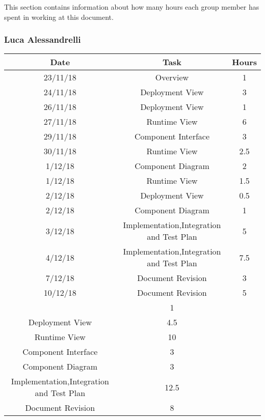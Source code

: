 \noindent
This section contains information about how many hours each group member has spent in working at this document.
\bigbreak

\subsubsection{Luca Alessandrelli}
\begin{table}[h]
\centering
\begin{tabular}{|c|c|c|}
\hline
\rowcolor[HTML]{FE996B} 
Date & Task & Hours 
\\ \hline
\rowcolor[HTML]{FFFC9E} 
23/11/18  & Overview & 1  
\\ \hline
\rowcolor[HTML]{FFFC9E} 
24/11/18 & Deployment View & 3  
\\ \hline
\rowcolor[HTML]{FFFC9E}
26/11/18 & Deployment View & 1 
\\ \hline
\rowcolor[HTML]{FFFC9E}
27/11/18 & Runtime View & 6 
\\ \hline
\rowcolor[HTML]{FFFC9E}
29/11/18 & Component Interface & 3
\\ \hline
\rowcolor[HTML]{FFFC9E}
30/11/18 & Runtime View & 2.5
\\ \hline
\rowcolor[HTML]{FFFC9E}
1/12/18 & Component Diagram & 2 
\\ \hline
\rowcolor[HTML]{FFFC9E}
1/12/18 & Runtime View & 1.5
\\ \hline
\rowcolor[HTML]{FFFC9E}
2/12/18 & Deployment View & 0.5
\\ \hline
\rowcolor[HTML]{FFFC9E}
2/12/18 & Component Diagram & 1 
\\ \hline
\rowcolor[HTML]{FFFC9E}
3/12/18 & Implementation,Integration and Test Plan & 5
\\ \hline
\rowcolor[HTML]{FFFC9E}
4/12/18 & Implementation,Integration and Test Plan & 7.5
\\ \hline
\rowcolor[HTML]{FFFC9E}
7/12/18 & Document Revision & 3
\\ \hline
\rowcolor[HTML]{FFFC9E}
10/12/18 & Document Revision & 5
\\ \hline

\rowcolor[HTML]{FFCE93} 
\multicolumn{2}{|c|}{Overview} & 1 \\ 
\hline
\rowcolor[HTML]{FFCE93} 
\multicolumn{2}{|c|} {Deployment View} & 4.5 \\
\hline
\rowcolor[HTML]{FFCE93} 
\multicolumn{2}{|c|} {Runtime View} & 10 \\
\hline
\rowcolor[HTML]{FFCE93} 
\multicolumn{2}{|c|} {Component Interface} & 3 \\
\hline
\rowcolor[HTML]{FFCE93} 
\multicolumn{2}{|c|} {Component Diagram} & 3 \\
\hline
\rowcolor[HTML]{FFCE93} 
\multicolumn{2}{|c|} {Implementation,Integration and Test Plan} & 12.5 \\
\hline
\rowcolor[HTML]{FFCE93} 
\multicolumn{2}{|c|} {Document Revision} & 8 \\
\hline




\end{tabular}
\end{table}
